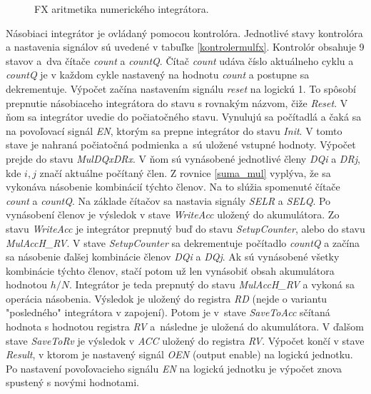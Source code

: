\bigskip
\begin{figure}[h]
\centering
{}
\caption{FX aritmetika numerického integrátora.}
\label{fxmularitmetic}
\end{figure}
\bigskip

Násobiaci integrátor je ovládaný pomocou kontrolóra. Jednotlivé stavy kontrolóra a nastavenia signálov sú uvedené v tabuľke \ref{kontrolermulfx}. Kontrolór obsahuje 9 stavov a dva čítače \textit{count} a \textit{countQ}. Čítač \textit{count} udáva číslo aktuálneho cyklu a \textit{countQ} je v každom cykle nastavený na hodnotu \textit{count} a postupne sa dekrementuje. Výpočet začína nastavením signálu \textit{reset} na logickú 1. To spôsobí prepnutie násobiaceho integrátora do stavu s rovnakým názvom, čiže \textit{Reset}. V ňom sa integrátor uvedie do počiatočného stavu. Vynulujú sa počítadlá a čaká sa na povoľovací signál \textit{EN}, ktorým sa prepne integrátor do stavu \textit{Init}. V tomto stave je nahraná počiatočná podmienka a sú uložené vstupné hodnoty. Výpočet prejde do stavu \textit{MulDQxDRx}. V ňom sú vynásobené jednotlivé členy \textit{DQi} a \textit{DRj}, kde $ i, j $ značí aktuálne počítaný člen. Z rovnice \ref{suma_mul} vyplýva, že sa vykonáva násobenie kombinácií týchto členov. Na to slúžia spomenuté čítače \textit{count} a \textit{countQ}. Na základe čítačov sa nastavia signály \textit{SELR} a \textit{SELQ}. Po vynásobení členov je výsledok v stave \textit{WriteAcc} uložený do akumulátora. Zo stavu \textit{WriteAcc} je integrátor prepnutý buď do stavu \textit{SetupCounter}, alebo do stavu \textit{MulAccH\_RV}. V stave \textit{SetupCounter} sa dekrementuje počítadlo \textit{countQ} a začína sa násobenie ďalšej kombinácie členov \textit{DQi} a \textit{DQj}. Ak sú vynásobené všetky kombinácie týchto členov, stačí potom už len vynásobiť obsah akumulátora hodnotou $ h/N $. Integrátor je teda prepnutý do stavu \textit{MulAccH\_RV} a vykoná sa operácia násobenia. Výsledok je uložený do registra \textit{RD} (nejde o variantu "posledného" integrátora v zapojení). Potom je v stave \textit{SaveToAcc} sčítaná hodnota s hodnotou registra \textit{RV} a následne je uložená do akumulátora. V ďalšom stave \textit{SaveToRv} je výsledok v \textit{ACC} uložený do registra \textit{RV}. Výpočet končí v stave \textit{Result}, v ktorom je nastavený signál \textit{OEN} (output enable) na logickú jednotku. Po nastavení povoľovacieho signálu \textit{EN} na logickú jednotku je výpočet znova spustený s novými hodnotami.

